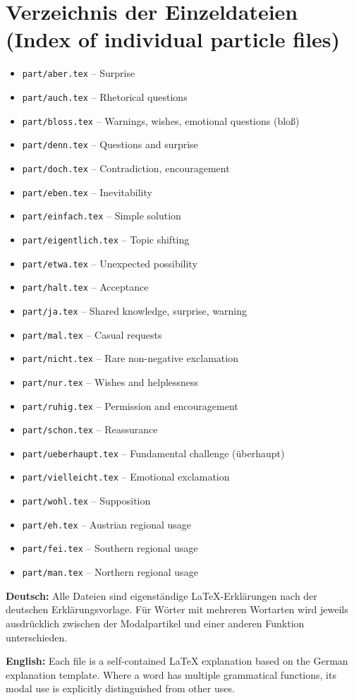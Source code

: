 \documentclass[a4paper,11pt]{article}
\newcommand{\GermanText}[1]{\textbf{Deutsch: }#1\par}
\newcommand{\EnglishText}[1]{{\small\color{SoftGray}\textbf{English: }#1\par}}
\begin{document}
\section{Verzeichnis der Einzeldateien \textnormal{(Index of individual particle files)}}
\begin{itemize}
\item \texttt{part/aber.tex} -- Surprise
\item \texttt{part/auch.tex} -- Rhetorical questions
\item \texttt{part/bloss.tex} -- Warnings, wishes, emotional questions (bloß)
\item \texttt{part/denn.tex} -- Questions and surprise
\item \texttt{part/doch.tex} -- Contradiction, encouragement
\item \texttt{part/eben.tex} -- Inevitability
\item \texttt{part/einfach.tex} -- Simple solution
\item \texttt{part/eigentlich.tex} -- Topic shifting
\item \texttt{part/etwa.tex} -- Unexpected possibility
\item \texttt{part/halt.tex} -- Acceptance
\item \texttt{part/ja.tex} -- Shared knowledge, surprise, warning
\item \texttt{part/mal.tex} -- Casual requests
\item \texttt{part/nicht.tex} -- Rare non-negative exclamation
\item \texttt{part/nur.tex} -- Wishes and helplessness
\item \texttt{part/ruhig.tex} -- Permission and encouragement
\item \texttt{part/schon.tex} -- Reassurance
\item \texttt{part/ueberhaupt.tex} -- Fundamental challenge (überhaupt)
\item \texttt{part/vielleicht.tex} -- Emotional exclamation
\item \texttt{part/wohl.tex} -- Supposition
\item \texttt{part/eh.tex} -- Austrian regional usage
\item \texttt{part/fei.tex} -- Southern regional usage
\item \texttt{part/man.tex} -- Northern regional usage
\end{itemize}
\GermanText{Alle Dateien sind eigenständige LaTeX-Erklärungen nach der deutschen Erklärungsvorlage. Für Wörter mit mehreren Wortarten wird jeweils ausdrücklich zwischen der Modalpartikel und einer anderen Funktion unterschieden.}
\EnglishText{Each file is a self-contained LaTeX explanation based on the German explanation template. Where a word has multiple grammatical functions, its modal use is explicitly distinguished from other uses.}
\end{document}
